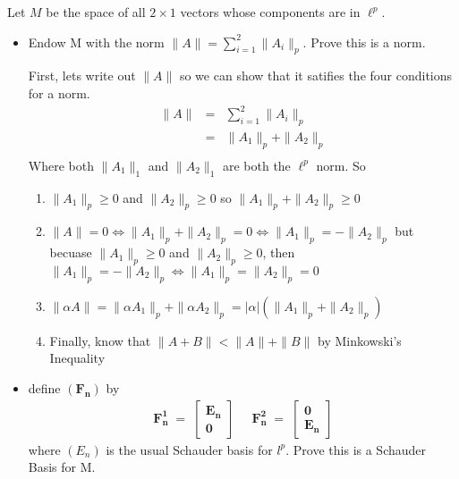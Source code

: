 \documentclass[11pt]{SelfArxOneColBMN}
\begin{document}
\begin{exercise}
    Let $M$ be the space of all $2 \times 1$ vectors whose components are in $\ell^p$.
    \begin{itemize}
        \item Endow M with the norm $\|A\| = \sum_{i = 1}^2\|A_i\|_p$. Prove this is a norm.
        \begin{solution}
            First, lets write out $\|A\|$ so we can show that it satifies the four conditions for a norm.
            \begin{eqnarray*}
                \|A\| &=& \sum_{i=1}^2\|A_i\|_p\\
                &=& \|A_1\|_p + \|A_2\|_p\\
            \end{eqnarray*}
            Where both $\|A_1\|_1$ and $\|A_2\|_1$ are both the $\ell^p$ norm. So 
            \begin{enumerate}
                \item $\|A_1\|_p \geq 0$ and $\|A_2\|_p \geq 0$ so $\|A_1\|_p + \|A_2\|_p \geq 0$
                \item $\|A\| = 0 \iff \|A_1\|_p + \|A_2\|_p = 0 \iff \|A_1\|_p = -\|A_2\|_p$ but becuase $\|A_1\|_p \geq 0$ and $\|A_2\|_p \geq 0$, then $\|A_1\|_p = -\|A_2\|_p \iff \|A_1\|_p = \|A_2\|_p = 0$
                \item $\|\alpha A\| = \|\alpha A_1\|_p + \|\alpha A_2\|_p = |\alpha|(\|A_1\|_p + \|A_2\|_p)$
                \item Finally, know that $\|A + B\| < \|A\| + \|B\|$ by Minkowski's Inequality
            \end{enumerate}
        \end{solution}
        \item define $\mathbf{(F_n)}$ by
        \begin{eqnarray*}
            \mathbf{F_n^1} \; = \;
            \begin{bmatrix}
                \mathbf{E_n}\\
                \mathbf{0}
            \end{bmatrix}
            \; & \;
            \mathbf{F_n^2} \; = \;
            \begin{bmatrix}
                \mathbf{0}\\
                \mathbf{E_n}
            \end{bmatrix}
        \end{eqnarray*}
        where $(E_n)$ is the usual Schauder basis for $l^p$. Prove this is a Schauder Basis for M.

\end{itemize}
\end{exercise}
\end{document}
